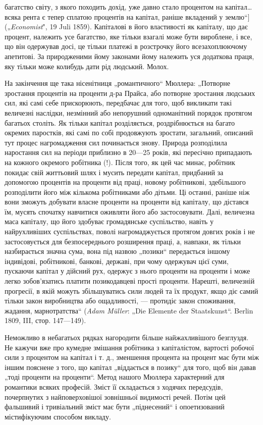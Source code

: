 \parcont{}  %
багатство світу, з якого походить дохід, уже давно стало процентом
на капітал\dots{} всяка рента є тепер сплатою процентів на
капітал, раніше вкладений у землю“] („\emph{Economist}", 19 Juli 1859).
Капіталові в його властивості як капіталу, що дає процент, належить
усе багатство, яке тільки взагалі може бути вироблене,
і все, що він одержував досі, це тільки платежі в розстрочку його
всезахоплюючому апетитові. За природженими йому законами
йому належить уся додаткова праця, яку тільки може колибудь
дати рід людський. Молох.

На закінчення ще така нісенітниця „романтичного“ Мюллера:
„Потворне зростання процентів на проценти д-ра Прайса, або
потворне зростання людських сил, які самі себе прискорюють,
передбачає для того, щоб викликати такі величезні наслідки,
незмінний або непорушний одноманітний порядок протягом багатьох
століть. Як тільки капітал розділяється, роздрібнюється
на багато окремих паростків, які самі по собі продовжують
зростати, загальний, описаний тут процес нагромадження сил
починається знову. Природа розподілила наростання сил на
періоди приблизно в 20—25 років, які пересічно припадають
на кожного окремого робітника (!). Після того, як цей час
минає, робітник покидає свій життьовий шлях і мусить передати
капітал, придбаний за допомогою процентів на проценти від
праці, новому робітникові, здебільшого розподілити його між
кількома робітниками або дітьми. Ці останні, раніше ніж вони
зможуть добувати власне проценти на проценти від капіталу,
що дістався їм, мусять спочатку навчитися оживляти його або
застосовувати. Далі, величезна маса капіталу, що його здобуває
громадянське суспільство, навіть у найрухливіших суспільствах,
поволі нагромаджується протягом довгих років і не
застосовується для безпосереднього розширення праці, а, навпаки,
як тільки назбирається значна сума, вона під назвою „позики“
передається іншому індивідові, робітникові, банкові, державі,
при чому одержувач цієї суми, пускаючи капітал у дійсний рух,
одержує з нього проценти на проценти і може легко зобов’язатись
платити позикодавцеві прості проценти. Нарешті, величезній
прогресії, в якій можуть збільшуватись сили людей та їх
продукт, якщо діє самий тільки закон виробництва або ощадливості,
— протидіє закон споживання, жадання, марнотратства“
(\emph{Adam Müller}: „Die Elemente der Staatskunst“. Berlin 1809, III,
стор. 147—149).

Неможливо в небагатьох рядках нагородити більше найжахливішого
безглуздя. Не кажучи вже про кумедне змішання
робітника з капіталістом, вартості робочої сили з процентом
на капітал і т. д., зменшення процента на процент має бути
між іншим пояснене з того, що капітал „віддається в позику“ для
того, щоб він давав „тоді проценти на проценти“. Метод нашого
Мюллера характерний для романтики всяких професій. Зміст її
складається з ходячих передсудів, почерпнутих з найповерховішої
зовнішньої видимості речей. Потім цей фальшивий і тривіальний
зміст має бути „піднесений“ і опоетизований містифікуючим
способом викладу.

